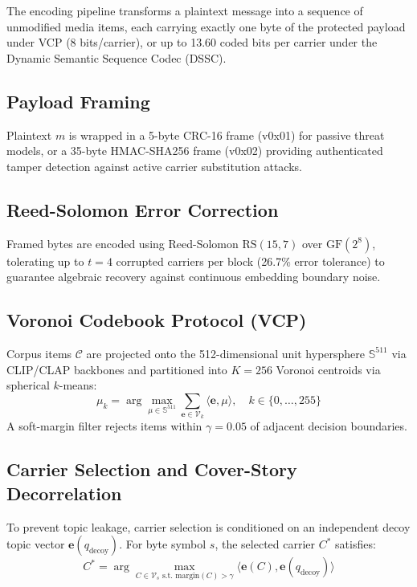 \documentclass[conference]{IEEEtran}
\begin{document}
The encoding pipeline transforms a plaintext message into a sequence of unmodified media items, each carrying exactly one byte of the protected payload under VCP (8 bits/carrier), or up to 13.60 coded bits per carrier under the Dynamic Semantic Sequence Codec (DSSC).

\subsection{Payload Framing}
Plaintext $m$ is wrapped in a 5-byte CRC-16 frame (v0x01) for passive threat models, or a 35-byte HMAC-SHA256 frame (v0x02) providing authenticated tamper detection against active carrier substitution attacks.

\subsection{Reed-Solomon Error Correction}
Framed bytes are encoded using Reed-Solomon $\text{RS}(15, 7)$ over $\text{GF}(2^8)$, tolerating up to $t = 4$ corrupted carriers per block (26.7\% error tolerance) to guarantee algebraic recovery against continuous embedding boundary noise.

\subsection{Voronoi Codebook Protocol (VCP)}
Corpus items $\mathcal{C}$ are projected onto the 512-dimensional unit hypersphere $\mathbb{S}^{511}$ via CLIP/CLAP backbones and partitioned into $K = 256$ Voronoi centroids via spherical $k$-means:
\begin{equation}
\mu_k = \arg\max_{\mu \in \mathbb{S}^{511}} \sum_{\mathbf{e} \in \mathcal{V}_k} \langle \mathbf{e}, \mu \rangle, \quad k \in \{0, \dots, 255\}
\end{equation}
A soft-margin filter rejects items within $\gamma = 0.05$ of adjacent decision boundaries.

\subsection{Carrier Selection and Cover-Story Decorrelation}
To prevent topic leakage, carrier selection is conditioned on an independent decoy topic vector $\mathbf{e}(q_{\text{decoy}})$. For byte symbol $s$, the selected carrier $C^*$ satisfies:
\begin{equation}
C^* = \arg\max_{C \in \mathcal{V}_s \text{ s.t. margin}(C) > \gamma} \langle \mathbf{e}(C), \mathbf{e}(q_{\text{decoy}}) \rangle
\end{equation}
\end{document}
